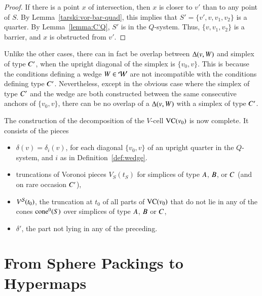 \begin{proof} If there is a point $x$ of intersection, then
$x$ is closer to $v'$ than to any point of $S$. 
By Lemma~\ref{tarski:vor-bar-quad}, this implies that 
$S'=\{v',v,v_1,v_2\}$ is a quarter.  By Lemma~\ref{lemma:C'Q},
$S'$ is in the $Q$-system.  Thus, $\{v,v_1,v_2\}$ is a barrier,
and $x$ is obstructed from $v'$.
\end{proof}


Unlike the other cases, there can in fact be overlap between
$\Delta(v,W)$ and simplex of type $C'$, when the upright
diagonal of the simplex is $\{v_0,v\}$.  This is because the
conditions defining a wedge $W\in{\mathcal W}$ are not incompatible with
the conditions defining type $C'$.  Nevertheless, except in the
obvious case where the simplex of type $C'$ and the wedge are both
constructed between the same consecutive anchors of $\{v_0,v\}$, there
can be no overlap of a $\Delta(v,W)$ with a simplex of type
$C'$.





The construction of the decomposition of the $V$-cell ${\operatorname{VC}}(v_0)$
is now complete. It consists of the pieces

    \begin{itemize}
    \item $\delta(v)=\delta_i(v)$,
         for each diagonal $\{v_0,v\}$ of an upright quarter
        in the $Q$-system, and $i$ as in Definition~\ref{def:wedge}.
    \item truncations of Voronoi pieces $V_S(t_S)$ for simplices of type
        $A$, $B$, or $C$ (and on rare occasion $C'$),
    \item $V^{{\mathcal S}}(t_0)$, the truncation at $t_0$ of all parts of
        ${\operatorname{VC}}(v_0)$ that do not lie in any of the cones ${\operatorname{cone}}^0(S)$ over
        simplices
        of type $A$, $B$ or $C$,
    \item $\delta'$, the part not lying in any of the preceding.
    \end{itemize}





\chapter{From Sphere Packings to Hypermaps}
    \label{sec:intro}
\label{chapter:VQ}

